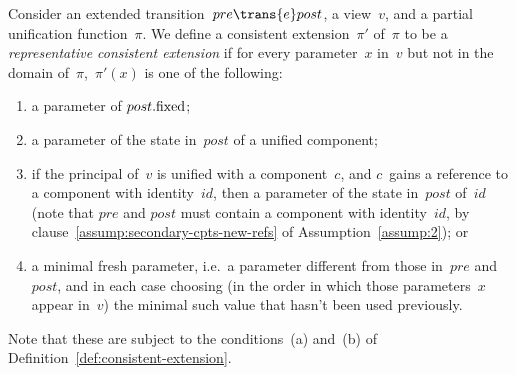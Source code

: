 
\begin{definition}
\label{def:representative-consistent-extension}
Consider an extended transition~$pre \trans{e} post$, a view~$v$, and a
partial unification function~$\pi$.  We define a consistent extension~$\pi'$
of~$\pi$ to be a \emph{representative consistent extension} if for every
parameter~$x$ in~$v$ but not in the domain of~$\pi$,\, $\pi'(x)$ is one of the
following:
%
\begin{enumerate}
\item\label{clause:remap-1} a parameter of $post.\mathrm{fixed}$; 

\item\label{clause:remap-2} a parameter of the state in~$post$ of a unified
  component;

\item\label{clause:remap-3} if the principal of~$v$ is unified with a
  component~$c$, and $c$~gains a reference to a component with identity~$id$,
  then a parameter of the state in~$post$ of~$id$ (note that $pre$ and $post$
  must contain a component with identity~$id$, by
  clause~\ref{assump:secondary-cpts-new-refs} of Assumption~\ref{assump:2}); or

\item\label{clause:remap-4} a minimal fresh parameter, i.e.~a parameter
  different from those in~$pre$ and~$post$, and in each case choosing (in the
  order in which those parameters~$x$ appear in~$v$) the minimal such value
  that hasn't been used previously. 
\end{enumerate}
%
%
Note that these are subject to the conditions~(a) and~(b) of
Definition~\ref{def:consistent-extension}. 
\end{definition}
%


